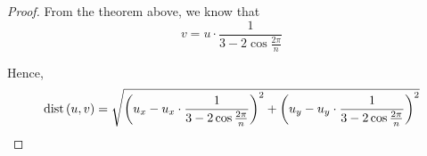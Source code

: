 \documentclass[11pt]{article}
\begin{document}
\begin{proof}
    From the theorem above, we know that
    \[ v = u \cdot \frac{1}{3 -2\cos{\frac{2\pi}{n}}} \]
    
    Hence,
    \[
    \text{dist}\left({u, v}\right) = 
    \sqrt{
    \left(u_x - u_x \cdot \frac{1}{3 -2\cos{\frac{2\pi}{n}}}
    \right)^2 +
    \left(u_y - u_y \cdot \frac{1}{3 -2\cos{\frac{2\pi}{n}}}
    \right)^2
    }
    \]
\end{proof}
\end{document}
